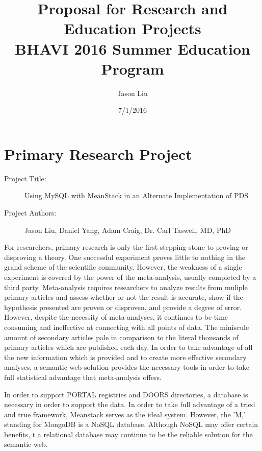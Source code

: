 \documentclass[12pt]{article}
\title{Proposal for Research and Education Projects\\
	 BHAVI 2016 Summer Education Program}
\author{Jason Liu}
\date{7/1/2016}
\begin{document}
\maketitle

\section{Primary Research Project}
	\begin{description}
		\item[Project Title:] Using MySQL with MeanStack in an Alternate Implementation of PDS
		\item[Project Authors:] Jason Liu, Daniel Yang, Adam Craig, Dr. Carl Taswell, MD, PhD 
	\end{description}

	For researchers, primary research is only the first stepping stone to proving or disproving a theory. One successful experiment proves little to nothing in the grand scheme of the scientific community. However, the weakness of a single experiment is covered by the power of the meta-analysis, usually completed by a third party. Meta-analysis requires researchers to analyze results from muliple primary articles and assess whether or not the result is accurate, show if the hypothesis presented are proven or disproven, and provide a degree of error. However, despite the necessity of meta-analyses, it continues to be time consuming and ineffective at connecting with all points of data. The miniscule amount of secondary articles pale in comparison to the literal thousands of primary articles which are published each day. In order to take advantage of all the new information which is provided and to create more effective secondary analyses, a semantic web solution provides the necessary tools in order to take full statistical advantage that meta-analysis offers.

	In order to support PORTAL registries and DOORS directories, a database is necessary in order to support the data. In order to take full advantage of a tried and true framework, Meanstack serves as the ideal system. However, the 'M,' standing for MongoDB is a NoSQL database. Although NoSQL may offer certain benefits, t a relational database may continue to be the reliable solution for the semantic web.  

\hfill
\end{document}
